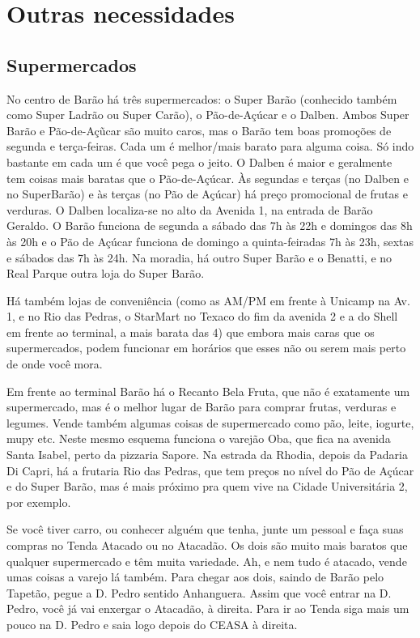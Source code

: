 
\section{Outras necessidades}
\subsection{Supermercados}

No centro de Barão há três supermercados: o Super Barão (conhecido também como
Super Ladrão ou Super Carão), o Pão-de-Açúcar e o Dalben. Ambos Super Barão
e Pão-de-Açũcar são muito caros, mas o Barão tem boas promoções de segunda
e terça-feiras. Cada um é melhor/mais barato para alguma coisa. Só indo bastante
em cada um é que você pega o jeito. O Dalben é maior
e geralmente tem coisas mais baratas que o Pão-de-Açúcar. Às segundas e terças
(no Dalben e no SuperBarão) e às terças (no Pão de Açúcar) há preço promocional
de frutas e verduras. O Dalben localiza-se no alto da Avenida 1, na entrada de
Barão Geraldo. O Barão funciona de segunda a sábado das 7h às 22h e domingos das
8h às 20h e o Pão de Açúcar funciona de domingo a quinta-feiradas 7h às 23h,
sextas e sábados das 7h às 24h. Na moradia, há outro Super Barão e o Benatti,
e no Real Parque outra loja do Super Barão.

Há também lojas de conveniência (como as AM/PM em frente à Unicamp na Av. 1, e no Rio das
Pedras, o StarMart no Texaco do fim da avenida 2 e a do Shell em frente ao
terminal, a mais barata das 4) que embora mais caras que os supermercados, podem
funcionar em horários que esses não ou serem mais perto de onde você mora.

Em frente ao terminal Barão há o Recanto Bela Fruta, que não é exatamente um
supermercado, mas é o melhor lugar de Barão para comprar frutas, verduras
e legumes. Vende também algumas coisas de supermercado como pão, leite, iogurte,
mupy etc. Neste mesmo esquema funciona o varejão Oba, que fica na avenida Santa
Isabel, perto da pizzaria Sapore. Na estrada da Rhodia, depois da Padaria Di
Capri, há a frutaria Rio das Pedras, que tem preços no nível do Pão de Açúcar
e do Super Barão, mas é mais próximo pra quem vive na Cidade Universitária 2,
por exemplo.

Se você tiver carro, ou conhecer alguém que tenha, junte um pessoal e faça suas
compras no Tenda Atacado ou no Atacadão. Os dois são muito mais baratos que
qualquer supermercado e têm muita variedade. Ah, e nem tudo é atacado, vende umas
coisas a varejo lá também. Para chegar aos dois, saindo de Barão pelo Tapetão,
pegue a D. Pedro sentido Anhanguera. Assim que você entrar na D. Pedro, você já
vai enxergar o Atacadão, à direita. Para ir ao Tenda siga mais um pouco na D.
Pedro e saia logo depois do CEASA à direita.

